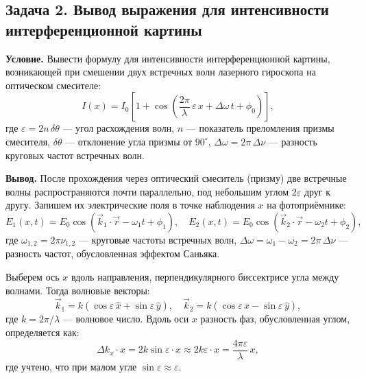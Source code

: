 \documentclass[12pt, a4paper]{article}
\begin{document}



\subsection*{Задача 2. Вывод выражения для интенсивности интерференционной картины}

\textbf{Условие.} Вывести формулу для интенсивности интерференционной картины, возникающей при смешении двух встречных волн лазерного гироскопа на оптическом смесителе:
\begin{equation}
    I(x) = I_0\left[1 + \cos\left(\frac{2\pi}{\lambda}\,\varepsilon\, x + \Delta\omega\, t + \phi_0\right)\right],
\end{equation}
где $\varepsilon = 2n\,\delta\theta$ --- угол расхождения волн, $n$ --- показатель преломления призмы смесителя, $\delta\theta$ --- отклонение угла призмы от $90^\circ$, $\Delta\omega = 2\pi\,\Delta\nu$ --- разность круговых частот встречных волн.

\textbf{Вывод.} После прохождения через оптический смеситель (призму) две встречные волны распространяются почти параллельно, под небольшим углом $2\varepsilon$ друг к другу. Запишем их электрические поля в точке наблюдения $x$ на фотоприёмнике:
\begin{equation}
    E_1(x, t) = E_0 \cos\left(\vec{k}_1 \cdot \vec{r} - \omega_1 t + \phi_1\right), \quad
    E_2(x, t) = E_0 \cos\left(\vec{k}_2 \cdot \vec{r} - \omega_2 t + \phi_2\right),
\end{equation}
где $\omega_{1,2} = 2\pi \nu_{1,2}$ --- круговые частоты встречных волн, $\Delta\omega = \omega_1 - \omega_2 = 2\pi\,\Delta\nu$ --- разность частот, обусловленная эффектом Саньяка.

Выберем ось $x$ вдоль направления, перпендикулярного биссектрисе угла между волнами. Тогда волновые векторы:
\begin{equation}
    \vec{k}_1 = k(\cos\varepsilon\,\hat{x} + \sin\varepsilon\,\hat{y}), \quad
    \vec{k}_2 = k(\cos\varepsilon\,\hat{x} - \sin\varepsilon\,\hat{y}),
\end{equation}
где $k = 2\pi/\lambda$ --- волновое число. Вдоль оси $x$ разность фаз, обусловленная углом, определяется как:
\begin{equation}
    \Delta k_x \cdot x = 2k\sin\varepsilon \cdot x \approx 2k\varepsilon \cdot x = \frac{4\pi\varepsilon}{\lambda}\,x,
\end{equation}
где учтено, что при малом угле $\sin\varepsilon \approx \varepsilon$.
\end{document}

